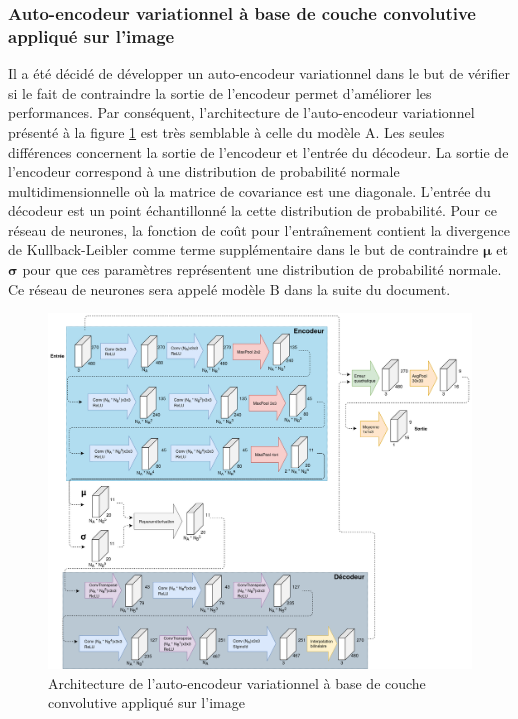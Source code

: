 \subsubsection{Auto-encodeur variationnel à base de couche convolutive appliqué sur l'image}
    Il a été décidé de développer un auto-encodeur variationnel dans le but de vérifier si le fait de contraindre la sortie de l'encodeur permet d'améliorer les performances. Par conséquent, l'architecture de l'auto-encodeur variationnel présenté à la figure \ref{fig:architecture_cnn_vae} est très semblable à celle du modèle A. Les seules différences concernent la sortie de l'encodeur et l'entrée du décodeur. La sortie de l'encodeur correspond à une distribution de probabilité normale multidimensionnelle où la matrice de covariance est une diagonale. L'entrée du décodeur est un point échantillonné la cette distribution de probabilité. Pour ce réseau de neurones, la fonction de coût pour l'entraînement contient la divergence de Kullback-Leibler comme terme supplémentaire dans le but de contraindre \(\boldsymbol{\mu}\) et \(\boldsymbol{\sigma}\) pour que ces paramètres représentent une distribution de probabilité normale. Ce réseau de neurones sera appelé modèle B dans la suite du document.
    \begin{figure}[H]
        \centering
        \includegraphics[width=17cm]{images/Architecture_CnnVae.png}
        \caption{Architecture de l'auto-encodeur variationnel à base de couche convolutive appliqué sur l'image}
        \label{fig:architecture_cnn_vae}
    \end{figure}

